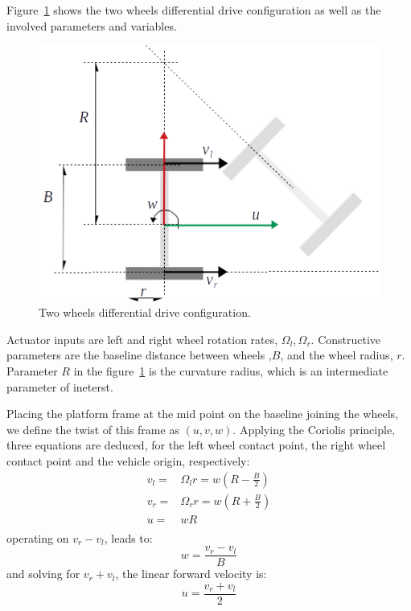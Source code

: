 Figure~\ref{fig:differential_kinematics} shows the two wheels differential drive configuration as well as the involved parameters and variables. 
\begin{figure}[bth!]
  \begin{center}
    \includegraphics[width=1.0\columnwidth]{figures/differential_kinematics.png}
    \caption{Two wheels differential drive configuration.}
    \label{fig:differential_kinematics}
  \end{center}
\end{figure}

Actuator inputs are left and right wheel rotation rates, $\Omega_l, \Omega_r$. Constructive parameters are the baseline distance between wheels ,$B$, and the wheel radius, $r$. Parameter $R$ in the figure~\ref{fig:differential_kinematics} is the curvature radius, which is an intermediate parameter of ineterst.

Placing the platform frame at the mid point on the baseline joining the wheels, we define the twist of this frame as $(u, v, w)$. Applying the Coriolis principle, three equations are deduced, for the left wheel contact point, the right wheel contact point and the vehicle origin, respectively:
\begin{align}
v_l = & \Omega_l r = w(R-\frac{B}{2}) \\
v_r = & \Omega_r r = w(R+\frac{B}{2}) \\
u = & wR \\
\end{align} 
operating on $v_r-v_l$, leads to:
\begin{equation}
\label{eq:diff_drive_fwd_kinematics_w}
w = \frac{v_r-v_l}{B}
\end{equation}
and solving for $v_r+v_l$, the linear forward velocity is:  
\begin{equation}
\label{eq:diff_drive_fwd_kinematics_u}
u = \frac{v_r+v_l}{2}
\end{equation}

